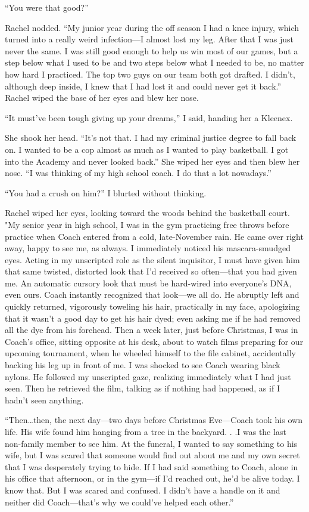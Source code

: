 ``You were that good?''

Rachel nodded. ``My junior year during the off season I had a knee
injury, which turned into a really weird infection---I almost lost my
leg. After that I was just never the same. I was still good enough to
help us win most of our games, but a step below what I used to be and
two steps below what I needed to be, no matter how hard I practiced. The
top two guys on our team both got drafted. I didn't, although deep
inside, I knew that I had lost it and could never get it back.'' Rachel
wiped the base of her eyes and blew her nose.

``It must've been tough giving up your dreams,'' I said, handing her a
Kleenex.

She shook her head. ``It's not that. I had my criminal justice degree to
fall back on. I wanted to be a cop almost as much as I wanted to play
basketball. I got into the Academy and never looked back.'' She wiped
her eyes and then blew her nose. ``I was thinking of my high school
coach. I do that a lot nowadays.''

``You had a crush on him?'' I blurted without thinking.

Rachel wiped her eyes, looking toward the woods behind the basketball
court. "My senior year in high school, I was in the gym practicing free
throws before practice when Coach entered from a cold, late-November
rain. He came over right away, happy to see me, as always. I immediately
noticed his mascara-smudged eyes. Acting in my unscripted role as the
silent inquisitor, I must have given him that same twisted, distorted
look that I'd received so often---that you had given me. An automatic
cursory look that must be hard-wired into everyone's DNA, even ours.
Coach instantly recognized that look---we all do. He abruptly left and
quickly returned, vigorously toweling his hair, practically in my face,
apologizing that it wasn't a good day to get his hair dyed; even asking
me if he had removed all the dye from his forehead. Then a week later,
just before Christmas, I was in Coach's office, sitting opposite at his
desk, about to watch films preparing for our upcoming tournament, when
he wheeled himself to the file cabinet, accidentally backing his leg up
in front of me. I was shocked to see Coach wearing black nylons. He
followed my unscripted gaze, realizing immediately what I had just seen.
Then he retrieved the film, talking as if nothing had happened, as if I
hadn't seen anything.

``Then\ldots then, the next day---two days before Christmas Eve---Coach
took his own life. His wife found him hanging from a tree in the
backyard. . .I was the last non-family member to see him. At the
funeral, I wanted to say something to his wife, but I was scared that
someone would find out about me and my own secret that I was desperately
trying to hide. If I had said something to Coach, alone in his office
that afternoon, or in the gym---if I'd reached out, he'd be alive today.
I know that. But I was scared and confused. I didn't have a handle on it
and neither did Coach---that's why we could've helped each other.''

